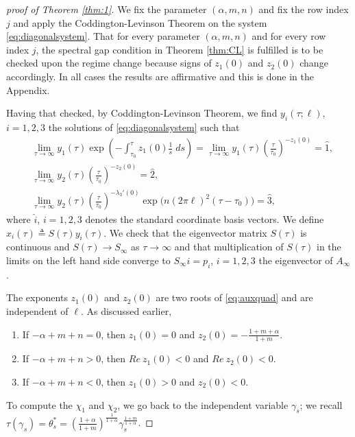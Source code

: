 \documentclass[a4paper,11pt]{article}
\def\l{(2\pi \ell)}
\theoremstyle{remark}
\begin{document}
\begin{proof}[proof of Theorem \ref{thm:1}]
We fix the parameter $(\alpha,m,n)$ and fix the row index $j$ and apply the Coddington-Levinson Theorem on the system \eqref{eq:diagonalsystem}. That for every parameter $(\alpha,m,n)$ and for every row index $j$, the spectral gap condition in Theorem \ref{thm:CL} is fulfilled is to be checked upon the regime change because signs of $z_1(0)$ and $z_2(0)$ change accordingly. In all cases the results are affirmative and this is done in the Appendix.

Having that checked, by Coddington-Levinson Theorem, we find $y_i(\tau;\ell)$, $i=1,2,3$ the solutions of \eqref{eq:diagonalsystem} such that
 \begin{align*}
 &\lim_{\tau \rightarrow \infty} y_1(\tau) \exp\left(-\int_{\tau_0}^\tau z_1(0)\frac{1}{s}\; ds\right) = \lim_{\tau \rightarrow \infty} y_1(\tau)\left(\frac{\tau}{\tau_0}\right)^{-z_1(0)} = \hat{1}, \\
 &\lim_{\tau \rightarrow \infty} y_2(\tau)\left(\frac{\tau}{\tau_0}\right)^{-z_2(0)} = \hat{2}, \\
 &\lim_{\tau \rightarrow \infty} y_2(\tau)\left(\frac{\tau}{\tau_0}\right)^{-\lambda_3'(0)}\exp\Big(n\l^2(\tau-\tau_0)\Big) = \hat{3},
 \end{align*}
 where $\hat{i}$, $i=1,2,3$ denotes the standard coordinate basis vectors. We define $x_i(\tau)\triangleq S(\tau)y_i(\tau)$. We check that the eigenvector matrix $S(\tau)$ is continuous and $S(\tau) \rightarrow S_\infty$ as $\tau \rightarrow \infty$ and that multiplication of $S(\tau)$ in the limits on the left hand side converge to $S_\infty \hat{i}=p_i$, $i=1,2,3$ the eigenvector of $A_\infty$.

 The exponents $z_1(0)$ and $z_2(0)$ are two roots of \eqref{eq:auxquad} and are independent of $\ell$. As discussed earlier,
 \begin{enumerate}
  \item If $-\alpha+m+n=0$, then $z_1(0)=0$ and $z_2(0)= -\frac{1+m+\alpha}{1+m}$.
  \item If $-\alpha+m+n>0$, then $Re ~z_1(0)<0$ and $Re ~z_2(0)<0$.
  \item If $-\alpha+m+n<0$, then $z_1(0)>0$ and $z_2(0)<0$.
 \end{enumerate}
To compute the $\chi_1$ and $\chi_2$, we go back to the independent variable $\gamma_s$; we recall $\tau(\gamma_s)= \theta_s^*=\left( \frac{1+\alpha}{1+m}\right)^{\frac{1}{1+\alpha}} \gamma_s^{\frac{1+m}{1+\alpha}}$.
\end{proof}
\end{document}
